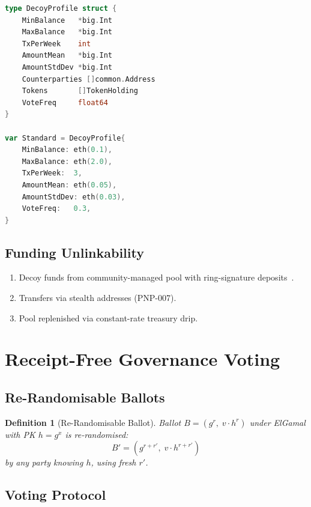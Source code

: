 \documentclass[11pt,a4paper]{article}
\newtheorem{definition}{Definition}[section]
\begin{document}
\begin{lstlisting}[language=Go,caption={Decoy Profile}]
type DecoyProfile struct {
    MinBalance   *big.Int
    MaxBalance   *big.Int
    TxPerWeek    int
    AmountMean   *big.Int
    AmountStdDev *big.Int
    Counterparties []common.Address
    Tokens       []TokenHolding
    VoteFreq     float64
}

var Standard = DecoyProfile{
    MinBalance: eth(0.1),
    MaxBalance: eth(2.0),
    TxPerWeek:  3,
    AmountMean: eth(0.05),
    AmountStdDev: eth(0.03),
    VoteFreq:   0.3,
}
\end{lstlisting}

\subsection{Funding Unlinkability}

\begin{enumerate}
    \item Decoy funds from community-managed pool with ring-signature
    deposits~\cite{noether2015ring}.
    \item Transfers via stealth addresses (PNP-007).
    \item Pool replenished via constant-rate treasury drip.
\end{enumerate}

\section{Receipt-Free Governance Voting}
\label{sec:voting}

\subsection{Re-Randomisable Ballots}

\begin{definition}[Re-Randomisable Ballot]
    Ballot $B = (g^r,\; v \cdot h^r)$ under ElGamal with PK $h = g^x$
    is re-randomised:
    \[
        B' = (g^{r+r'},\; v \cdot h^{r+r'})
    \]
    by any party knowing $h$, using fresh $r'$.
\end{definition}

\subsection{Voting Protocol}
\end{document}
